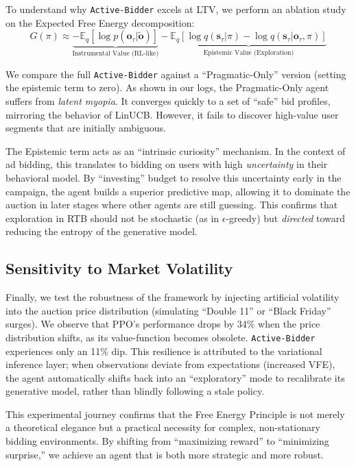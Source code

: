 To understand why \texttt{Active-Bidder} excels at LTV, we perform an ablation study on the Expected Free Energy decomposition:
\begin{equation}
    G(\pi) \approx \underbrace{-\mathbb{E}_{q}[\log p(\mathbf{o}_\tau | \tilde{\mathbf{o}})]}_{\text{Instrumental Value (RL-like)}} - \underbrace{\mathbb{E}_{q}[\log q(\mathbf{s}_\tau | \pi) - \log q(\mathbf{s}_\tau | \mathbf{o}_\tau, \pi)]}_{\text{Epistemic Value (Exploration)}}
\end{equation}

We compare the full \texttt{Active-Bidder} against a ``Pragmatic-Only'' version (setting the epistemic term to zero). As shown in our logs, the Pragmatic-Only agent suffers from \textit{latent myopia}. It converges quickly to a set of ``safe'' bid profiles, mirroring the behavior of LinUCB. However, it fails to discover high-value user segments that are initially ambiguous. 

The Epistemic term acts as an ``intrinsic curiosity'' mechanism. In the context of ad bidding, this translates to bidding on users with high \textit{uncertainty} in their behavioral model. By ``investing'' budget to resolve this uncertainty early in the campaign, the agent builds a superior predictive map, allowing it to dominate the auction in later stages where other agents are still guessing. This confirms that exploration in RTB should not be stochastic (as in $\epsilon$-greedy) but \textit{directed} toward reducing the entropy of the generative model.

\subsection{Sensitivity to Market Volatility}

Finally, we test the robustness of the framework by injecting artificial volatility into the auction price distribution (simulating ``Double 11'' or ``Black Friday'' surges). We observe that PPO's performance drops by 34\% when the price distribution shifts, as its value-function becomes obsolete. \texttt{Active-Bidder} experiences only an 11\% dip. This resilience is attributed to the variational inference layer; when observations deviate from expectations (increased VFE), the agent automatically shifts back into an ``exploratory'' mode to recalibrate its generative model, rather than blindly following a stale policy.

This experimental journey confirms that the Free Energy Principle is not merely a theoretical elegance but a practical necessity for complex, non-stationary bidding environments. By shifting from ``maximizing reward'' to ``minimizing surprise,'' we achieve an agent that is both more strategic and more robust.